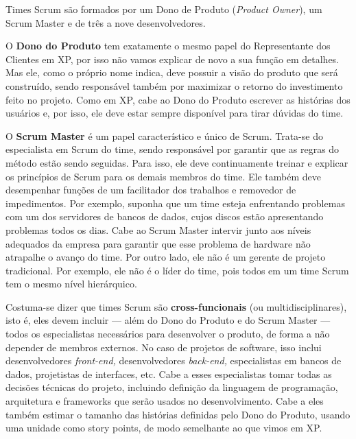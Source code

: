 \documentclass[
  11pt,
  twoside]{book}
\begin{document}
 Times Scrum são formados por um Dono de Produto
(\emph{Product Owner}), um Scrum Master e de três a nove
desenvolvedores.

 
 

O \textbf{Dono do Produto} tem exatamente o mesmo papel do Representante
dos Clientes em XP, por isso não vamos explicar de novo a sua função em
detalhes. Mas ele, como o próprio nome indica, deve possuir a visão do
produto que será construído, sendo responsável também por maximizar o
retorno do investimento feito no projeto. Como em XP, cabe ao Dono do
Produto escrever as histórias dos usuários e, por isso, ele deve estar
sempre disponível para tirar dúvidas do time.

  O \textbf{Scrum Master}
é um papel característico e único de Scrum. Trata-se do especialista em
Scrum do time, sendo responsável por garantir que as regras do método
estão sendo seguidas. Para isso, ele deve continuamente treinar e
explicar os princípios de Scrum para os demais membros do time. Ele
também deve desempenhar funções de um facilitador dos trabalhos e
removedor de impedimentos. Por exemplo, suponha que um time esteja
enfrentando problemas com um dos servidores de bancos de dados, cujos
discos estão apresentando problemas todos os dias. Cabe ao Scrum Master
intervir junto aos níveis adequados da empresa para garantir que esse
problema de hardware não atrapalhe o avanço do time. Por outro lado, ele
não é um gerente de projeto tradicional. Por exemplo, ele não é o líder
do time, pois todos em um time Scrum tem o mesmo nível hierárquico.

Costuma-se dizer que times Scrum são \textbf{cross-funcionais} (ou
multidisciplinares), isto é, eles devem incluir --- além do Dono do
Produto e do Scrum Master --- todos os especialistas necessários para
desenvolver o produto, de forma a não depender de membros externos. No
caso de projetos de software, isso inclui desenvolvedores
\emph{front-end,} desenvolvedores \emph{back-end,} especialistas em
bancos de dados, projetistas de interfaces, etc. Cabe a esses
especialistas tomar todas as decisões técnicas do projeto, incluindo
definição da linguagem de programação, arquitetura e frameworks que
serão usados no desenvolvimento. Cabe a eles também estimar o tamanho
das histórias definidas pelo Dono do Produto, usando uma unidade como
story points, de modo semelhante ao que vimos em XP.
\end{document}

